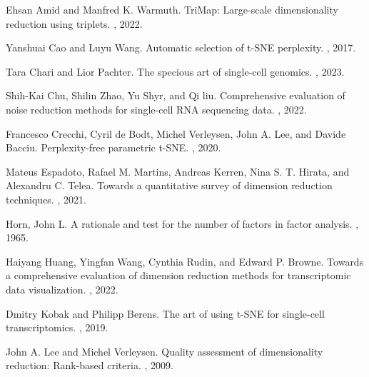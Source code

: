 \documentclass[webpdf,modern,large,namedate]{oup-authoring-template}
\theoremstyle{thmstyleone}%
\theoremstyle{thmstyletwo}%
\theoremstyle{thmstylethree}%
\begin{document}
\begin{thebibliography}{10}

Ehsan Amid and Manfred K. Warmuth. 
\newblock TriMap: Large-scale dimensionality reduction using triplets. 
, 2022.

Yanshuai Cao and Luyu Wang. 
\newblock Automatic selection of t-SNE perplexity.
, 2017.

Tara Chari and Lior Pachter.
\newblock The specious art of single-cell genomics.
,  2023.

Shih-Kai Chu, Shilin Zhao, Yu Shyr, and Qi liu.
\newblock Comprehensive evaluation of noise reduction methods for single-cell RNA sequencing data.
, 2022.

Francesco Crecchi, Cyril de Bodt, Michel Verleysen, John A. Lee, and Davide Bacciu.
\newblock Perplexity-free parametric t-SNE.
, 2020.

Mateus Espadoto, Rafael M. Martins, Andreas Kerren, Nina S. T. Hirata, and Alexandru C. Telea.
\newblock Towards a quantitative survey of dimension reduction techniques.
, 2021.

Horn, John L.
\newblock A rationale and test for the number of factors in factor analysis.
, 1965.

Haiyang Huang, Yingfan Wang, Cynthia Rudin, and Edward P. Browne.
\newblock Towards a comprehensive evaluation of dimension reduction methods for transcriptomic data visualization.
, 2022.

Dmitry Kobak and Philipp Berens.
\newblock The art of using t-SNE for single-cell transcriptomics.
, 2019.

John A. Lee and Michel Verleysen.
\newblock Quality assessment of dimensionality reduction: Rank-based criteria.
, 2009.


\end{thebibliography}
\end{document}
